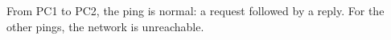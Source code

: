 From PC1 to PC2, the ping is normal: a request followed by a reply.
For the other pings, the network is unreachable.
